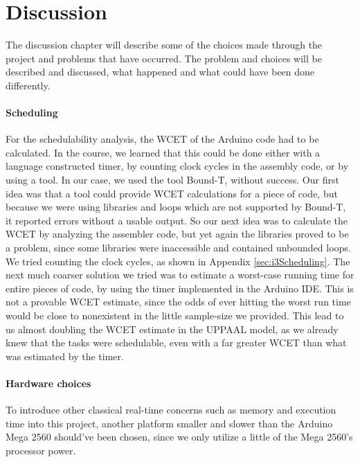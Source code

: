 \chapter{Discussion}
\label{chap:Discussion}
The discussion chapter will describe some of the choices made through the project and problems that have occurred. The problem and choices will be described and discussed, what happened and what could have been done differently. 


\subsubsection{Scheduling}
For the schedulability analysis, the WCET of the Arduino code had to be calculated. In the course, we learned that this could be done either with a language constructed timer, by counting clock cycles in the assembly code, or by using a tool. In our case, we used the tool Bound-T, without success. Our first idea was that a tool could provide WCET calculations for a piece of code, but because we were using libraries and loops which are not supported by Bound-T, it reported errors without a usable output. So our next idea was to calculate the WCET by analyzing the assembler code, but yet again the libraries proved to be a problem, since some libraries were inaccessible and contained unbounded loops. We tried counting the clock cycles, as shown in Appendix \ref{sec:i3Scheduling}. The next much coarser solution we tried was to estimate a worst-case running time for entire pieces of code, by using the timer implemented in the Arduino IDE. This is not a provable WCET estimate, since the odds of ever hitting the worst run time would be close to nonexistent in the little sample-size we provided. This lead to us almost doubling the WCET estimate in the UPPAAL model, as we already knew that the tasks were schedulable, even with a far greater WCET than what was estimated by the timer.


\subsubsection{Hardware choices}
To introduce other classical real-time concerns such as memory and execution time into this project, another platform smaller and slower than the Arduino Mega 2560 should’ve been chosen, since we only utilize a little of the Mega 2560’s processor power. 


